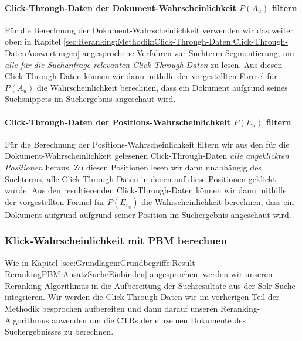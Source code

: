 \paragraph{Click-Through-Daten der Dokument-Wahrscheinlichkeit $P(A_{u})$ filtern}
Für die Berechnung der Dokument-Wahrscheinlichkeit verwenden wir das weiter oben in Kapitel \ref{sec:Reranking:Methodik:Click-Through-Daten:Click-Through-DatenAuswertungen} angesprochene Verfahren zur Suchterm-Segmentierung, um \textit{alle für die Suchanfrage relevanten Click-Through-Daten} zu lesen. Aus diesen Click-Through-Daten können wir dann mithilfe der vorgestellten Formel für $P(A_{u})$ die Wahrscheinlichkeit berechnen, dass ein Dokument aufgrund seines Suchsnippets im Suchergebnis angeschaut wird.  

\paragraph{Click-Through-Daten der Positions-Wahrscheinlichkeit $P(E_{u})$ filtern}
Für die Berechnung der Positions-Wahrscheinlichkeit filtern wir aus den für die Dokument-Wahrscheinlichkeit
gelesenen Click-Through-Daten \textit{alle angeklickten Positionen} heraus. Zu diesen Positionen lesen wir dann unabhängig des Suchterms, alle Click-Through-Daten in denen auf diese Positionen geklickt wurde. Aus den resultierenden Click-Through-Daten können wir dann mithilfe der vorgestellten Formel für $P(E_{r_u})$ die Wahrscheinlichkeit berechnen, dass ein Dokument aufgrund aufgrund seiner Position im Suchergebnis angeschaut wird.

\subsubsection{Klick-Wahrscheinlichkeit mit PBM berechnen}
\label{sec:Reranking:Methodik:Result-RerankingPBM:Klick-Wahrscheinlichkeit}

Wie in Kapitel \ref{sec:Grundlagen:Grundbegriffe:Result-RerankingPBM:AnsatzSucheEinbinden} angesprochen, werden wir unseren Reranking-Algorithmus in die Aufbereitung der Suchresultate aus der Solr-Suche integrieren. Wir werden die Click-Through-Daten wie im vorherigen Teil der Methodik besprochen aufbereiten und dann darauf unseren Reranking-Algorithmus anwenden um die CTRs der einzelnen Dokumente des Suchergebnisses zu berechnen. 

